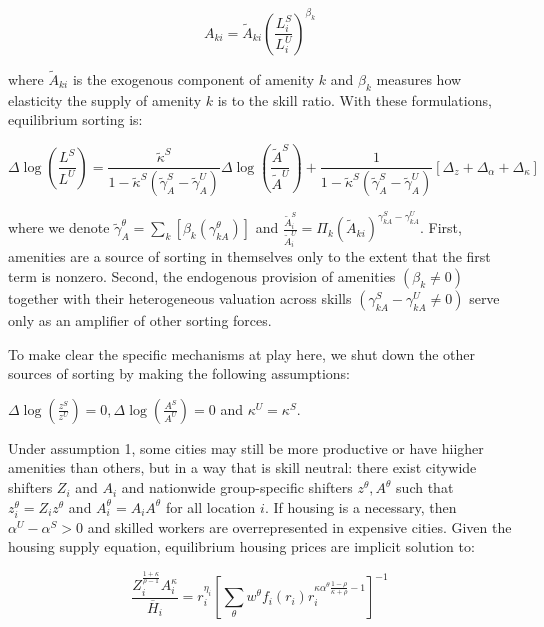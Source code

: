 \begin{equation}
  A_{ki} = \tilde{A}_{ki} (\frac{L_i^S}{L_i^U})^{\beta_k}
\end{equation}

where $\tilde{A}_{ki}$ is the exogenous component of amenity $k$ and $\beta_k$ measures how elasticity the supply of amenity $k$ is to the skill ratio. With these formulations, equilibrium sorting is:

\begin{equation*}
  \Delta \log(\frac{L^S}{L^U}) = \frac{\tilde{\kappa}^S}{1 - \tilde{\kappa}^S(\tilde{\gamma}_A^S - \tilde{\gamma}_A^U)} \Delta \log(\frac{\tilde{A}^S}{\tilde{A}^U}) + \frac{1}{1 - \tilde{\kappa}^S(\tilde{\gamma}_A^S - \tilde{\gamma}_A^U)}[\Delta_z + \Delta_{\alpha} + \Delta_{\kappa}]
\end{equation*}

where we denote $\tilde{\gamma}_A^{\theta} = \sum_k [\beta_k (\gamma_{kA}^{\theta})]$ and $\frac{\tilde{A}_i^S}{\tilde{A}_i^U} = \Pi_k (\tilde{A}_{ki})^{\gamma_{kA}^S - \gamma_{kA}^U}$. First, amenities are a source of sorting in themselves only to the extent that the first term is nonzero. Second, the endogenous provision of amenities $(\beta_k \neq 0)$ together with their heterogeneous valuation across skills $(\gamma_{kA}^S - \gamma_{kA}^U \neq 0)$ serve only as an amplifier of other sorting forces.

To make clear the specific mechanisms at play here, we shut down the other sources of sorting by making the following assumptions:

\begin{assumption}
  $\Delta \log(\frac{z^S}{z^U}) = 0, \Delta \log(\frac{A^S}{A^U}) = 0$ and $\kappa^U = \kappa^S$.
\end{assumption}

Under assumption 1, some cities may still be more productive or have hiigher amenities than others, but in a way that is skill neutral: there exist citywide shifters $Z_i$ and $A_i$ and nationwide group-specific shifters $z^{\theta}, A^{\theta}$ such that $z_i^{\theta} = Z_i z^{\theta}$ and $A_i^{\theta} = A_i A^{\theta}$ for all location $i$. If housing is a necessary, then $\alpha^U - \alpha^S > 0$ and skilled workers are overrepresented in expensive cities. Given the housing supply equation, equilibrium housing prices are implicit solution to:

\begin{equation}
  \frac{Z_i^{\frac{1 + \kappa}{\rho - 1}}A_i^{\kappa}}{\overline{H}_i} = r_i^{\eta_i} \left[ \sum_{\theta} w^{\theta} f_i(r_i)r_i^{\kappa \alpha^{\theta} \frac{1 - \rho}{\kappa + \rho} - 1} \right]^{-1}
\end{equation}

